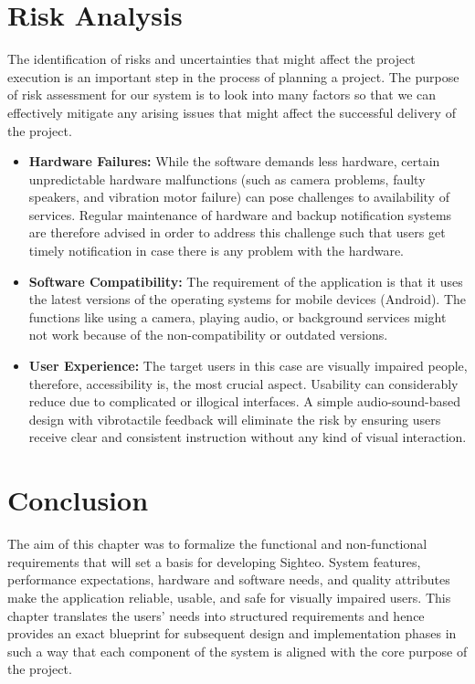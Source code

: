 \documentclass{FastFyp}
\begin{document}
\section{Risk Analysis}
The identification of risks and uncertainties that might affect the project execution is an important step in the process of planning a project. The purpose of risk assessment for our system is to look into many factors so that we can effectively mitigate any arising issues that might affect the successful delivery of the project.

\begin{itemize}
    \item \textbf{Hardware Failures:} While the software demands less hardware, certain unpredictable hardware malfunctions (such as camera problems, faulty speakers, and vibration motor failure) can pose challenges to availability of services. Regular maintenance of hardware and backup notification systems are therefore advised in order to address this challenge such that users get timely notification in case there is any problem with the hardware.
    
    \item \textbf{Software Compatibility:} The requirement of the application is that it uses the latest versions of the operating systems for mobile devices (Android). The functions like using a camera, playing audio, or background services might not work because of the non-compatibility or outdated versions.
     
    \item \textbf{User Experience:} The target users in this case are visually impaired people, therefore, accessibility is, the most crucial aspect. Usability can considerably reduce due to complicated or illogical interfaces. A simple audio-sound-based design with vibrotactile feedback will eliminate the risk by ensuring users receive clear and consistent instruction without any kind of visual interaction.
\end{itemize}

\section{Conclusion}
The aim of this chapter was to formalize the functional and non-functional requirements that will set a basis for developing Sighteo. System features, performance expectations, hardware and software needs, and quality attributes make the application reliable, usable, and safe for visually impaired users. This chapter translates the users' needs into structured requirements and hence provides an exact blueprint for subsequent design and implementation phases in such a way that each component of the system is aligned with the core purpose of the project.
\end{document}
